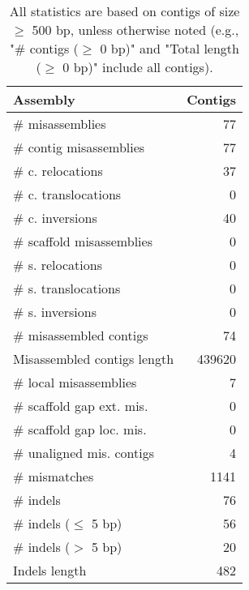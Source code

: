 \documentclass[12pt,a4paper]{article}
\begin{document}
\begin{table}[ht]
\begin{center}
\caption{All statistics are based on contigs of size $\geq$ 500 bp, unless otherwise noted (e.g., "\# contigs ($\geq$ 0 bp)" and "Total length ($\geq$ 0 bp)" include all contigs).}
\begin{tabular}{|l*{1}{|r}|}
\hline
Assembly & Contigs \\ \hline
\# misassemblies & 77 \\ \hline
\hspace{2mm}\# contig misassemblies & 77 \\ \hline
\hspace{5mm}\# c. relocations & 37 \\ \hline
\hspace{5mm}\# c. translocations & 0 \\ \hline
\hspace{5mm}\# c. inversions & 40 \\ \hline
\hspace{2mm}\# scaffold misassemblies & 0 \\ \hline
\hspace{5mm}\# s. relocations & 0 \\ \hline
\hspace{5mm}\# s. translocations & 0 \\ \hline
\hspace{5mm}\# s. inversions & 0 \\ \hline
\# misassembled contigs & 74 \\ \hline
Misassembled contigs length & 439620 \\ \hline
\# local misassemblies & 7 \\ \hline
\# scaffold gap ext. mis. & 0 \\ \hline
\# scaffold gap loc. mis. & 0 \\ \hline
\# unaligned mis. contigs & 4 \\ \hline
\# mismatches & 1141 \\ \hline
\# indels & 76 \\ \hline
\hspace{5mm}\# indels ($\leq$ 5 bp) & 56 \\ \hline
\hspace{5mm}\# indels ($>$ 5 bp) & 20 \\ \hline
Indels length & 482 \\ \hline
\end{tabular}
\end{center}
\end{table}
\end{document}
